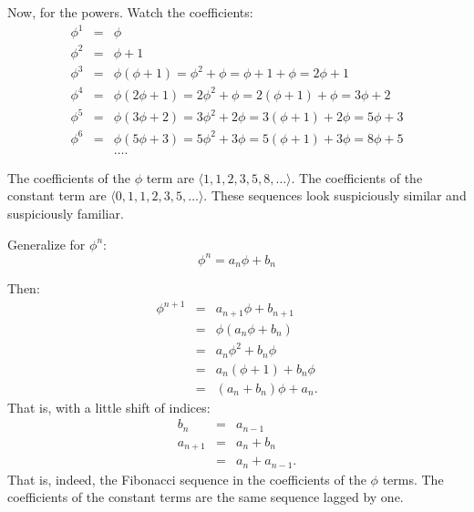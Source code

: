 \documentclass{article}
\begin{document}
Now, for the powers.  Watch the coefficients:
\begin{eqnarray*}
  \phi^1 & = & \phi \\
  \phi^2 & = & \phi + 1 \\
  \phi^3 & = & \phi(\phi + 1) = \phi^2 + \phi = \phi + 1 + \phi = 2\phi + 1 \\
  \phi^4 & = & \phi(2\phi + 1) = 2\phi^2 + \phi = 2(\phi + 1) + \phi = 3\phi + 2 \\
  \phi^5 & = & \phi(3\phi + 2) = 3\phi^2 + 2\phi = 3(\phi + 1) + 2\phi = 5\phi + 3 \\
  \phi^6 & = & \phi(5\phi + 3) = 5\phi^2 + 3\phi = 5(\phi + 1) + 3\phi = 8\phi + 5 \\
  & & \ldots.
\end{eqnarray*}

The coefficients of the $\phi$ term are $\langle 1, 1, 2, 3, 5, 8, \ldots\rangle$.  The coefficients of the constant term are $\langle 0, 1, 1, 2, 3, 5, \ldots\rangle$.  These sequences look suspiciously similar and suspiciously familiar.

Generalize for $\phi^n$:
\begin{equation}
  \phi^n = a_n\phi + b_n
\end{equation}

Then:
\begin{eqnarray*}
  \phi^{n+1} & = & a_{n+1}\phi + b_{n+1} \\
  & = & \phi(a_n\phi + b_n) \\
  & = & a_n\phi^2 + b_n\phi \\
  & = & a_n(\phi + 1) + b_n\phi \\
  & = & (a_n + b_n) \phi + a_n.
\end{eqnarray*}
That is, with a little shift of indices:
\begin{eqnarray*}
  b_n & = & a_{n-1} \\
  a_{n+1} & = & a_n + b_n \\
  & = & a_n + a_{n-1}.
\end{eqnarray*}
That is, indeed, the Fibonacci sequence in the coefficients of the $\phi$ terms.  The coefficients of the constant terms are the same sequence lagged by one.
\end{document}
